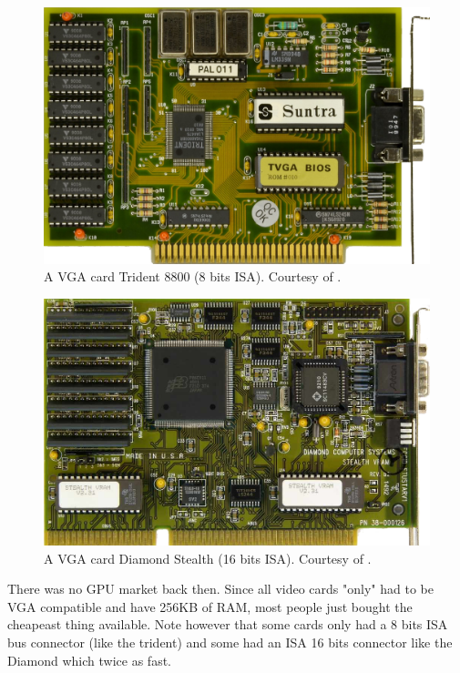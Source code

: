 \documentclass[book.tex]{subfiles}
\begin{document}
\begin{figure}[H] 
  \centering \includegraphics[width=\textwidth]{imgs/hardware/suntra_trident_tvga8800br.png} 
  \caption{A VGA card Trident 8800 (8 bits ISA). Courtesy of .}
\end{figure}
\par
\begin{figure}[H] 
  \centering 
  \includegraphics[width=\textwidth]{imgs/hardware/diamond_stealth_vram_revb2.png} 
  \caption{A VGA card Diamond Stealth (16 bits ISA). Courtesy of .}
\end{figure}
 There was no GPU market back then. Since all video cards "only" had to be VGA compatible and have 256KB of RAM, most people just bought the cheapeast thing available. Note however that some cards only had a 8 bits ISA bus connector (like the trident) and some had an ISA 16 bits connector like the Diamond which twice as fast.\\
\par
\end{document}
